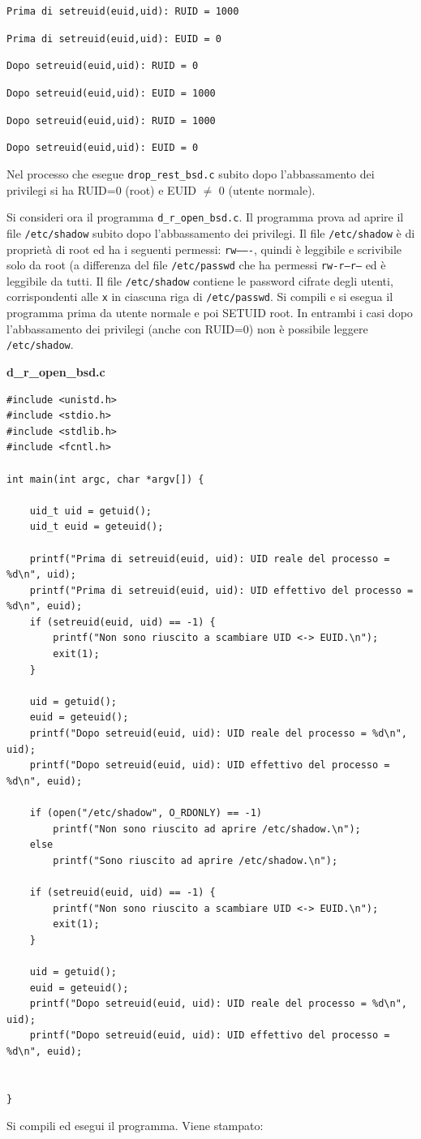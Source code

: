\texttt{Prima di setreuid(euid,uid): RUID = 1000}

\texttt{Prima di setreuid(euid,uid): EUID = 0}

\texttt{Dopo setreuid(euid,uid): RUID = 0}

\texttt{Dopo setreuid(euid,uid): EUID = 1000}

\texttt{Dopo setreuid(euid,uid): RUID = 1000}

\texttt{Dopo setreuid(euid,uid): EUID = 0}

Nel processo che esegue \texttt{drop\_rest\_bsd.c} subito dopo l'abbassamento dei privilegi si ha RUID=0 (root) e EUID \(\neq\) 0 (utente normale).

\vspace{5mm}

Si consideri ora il programma \texttt{d\_r\_open\_bsd.c}. Il programma prova ad aprire il file \texttt{/etc/shadow} subito dopo l'abbassamento dei privilegi. Il file \texttt{/etc/shadow} è di proprietà di root ed ha i seguenti permessi: \texttt{rw-------}, quindi è leggibile e scrivibile solo da root (a differenza del file \texttt{/etc/passwd} che ha permessi \texttt{rw-r--r--} ed è leggibile da tutti. Il file \texttt{/etc/shadow} contiene le password cifrate degli utenti, corrispondenti alle \texttt{x} in ciascuna riga di \texttt{/etc/passwd}. Si compili e si esegua il programma prima da utente normale e poi SETUID root. In entrambi i casi dopo l'abbassamento dei privilegi (anche con RUID=0) non è possibile leggere \texttt{/etc/shadow}.

\begin{mdframed}[backgroundcolor=white!20,shadow=false]
\textbf{d\_r\_open\_bsd.c}
\begin{verbatim}
#include <unistd.h>
#include <stdio.h>
#include <stdlib.h>
#include <fcntl.h>

int main(int argc, char *argv[]) {

	uid_t uid = getuid();
	uid_t euid = geteuid();

	printf("Prima di setreuid(euid, uid): UID reale del processo = %d\n", uid);
	printf("Prima di setreuid(euid, uid): UID effettivo del processo = %d\n", euid);
	if (setreuid(euid, uid) == -1) {
		printf("Non sono riuscito a scambiare UID <-> EUID.\n");
		exit(1);
	}

	uid = getuid();
	euid = geteuid();
	printf("Dopo setreuid(euid, uid): UID reale del processo = %d\n", uid);
	printf("Dopo setreuid(euid, uid): UID effettivo del processo = %d\n", euid);

	if (open("/etc/shadow", O_RDONLY) == -1)
		printf("Non sono riuscito ad aprire /etc/shadow.\n");
	else
		printf("Sono riuscito ad aprire /etc/shadow.\n");

	if (setreuid(euid, uid) == -1) {
		printf("Non sono riuscito a scambiare UID <-> EUID.\n");
		exit(1);
	}

	uid = getuid();
	euid = geteuid();
	printf("Dopo setreuid(euid, uid): UID reale del processo = %d\n", uid);
	printf("Dopo setreuid(euid, uid): UID effettivo del processo = %d\n", euid);

	
}
\end{verbatim}
\end{mdframed}
Si compili ed esegui il programma. Viene stampato:


